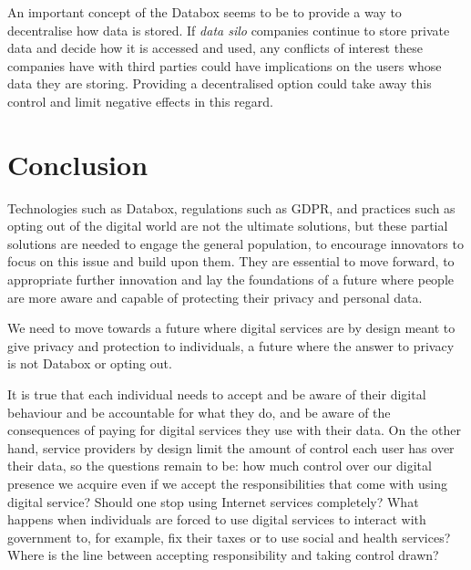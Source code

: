 \documentclass[format=acmsmall, review=false, screen=true]{acmart}
\begin{document}
An important concept of the Databox seems to be to provide a way to decentralise how data is stored. If \textit{data silo} companies continue to store private data and decide how it is accessed and used, any conflicts of interest these companies have with third parties could have implications on the users whose data they are storing. Providing a decentralised option could take away this control and limit negative effects in this regard.

\section{Conclusion}
Technologies such as Databox, regulations such as GDPR, and practices such as opting out of the digital world are not the ultimate solutions, but these partial solutions are needed to engage the general population, to encourage innovators to focus on this issue and build upon them. They are essential to move forward, to appropriate further innovation and lay the foundations of a future where people are more aware and capable of protecting their privacy and personal data.

We need to move towards a future where digital services are by design meant to give privacy and protection to individuals, a future where the answer to privacy is not Databox or opting out.

It is true that each individual needs to accept and be aware of their digital behaviour and be accountable for what they do, and be aware of the consequences of paying for digital services they use with their data. On the other hand, service providers by design limit the amount of control each user has over their data, so the questions remain to be: how much control over our digital presence we acquire even if we accept the responsibilities that come with using digital service? Should one stop using Internet services completely? What happens when individuals are forced to use digital services to interact with government to, for example, fix their taxes or to use social and health services? Where is the line between accepting responsibility and taking control drawn?
\end{document}
